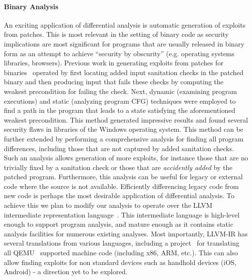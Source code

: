 
\paragraph{Binary Analysis}
An exciting application of differential analysis is automatic generation of exploits from patches. This is most relevant in the setting of binary code as security implications are most significant for programs that are usually released in binary form as an attempt to achieve ``security by obscurity'' (e.g. operating systems libraries, browsers). Previous work in generating exploits from patches for binaries~\cite{BrumleyPoosankamSongZheng08} operated by first locating added input sanitation checks in the patched binary and then producing input that fails these checks by computing the weakest precondition for failing the check. Next, dynamic (examining program executions) and static (analyzing program CFG) techniques were employed to find a path in the program that leads to a state satisfying the aforementioned weakest precondition. This method generated impressive results and found several security flaws in libraries of the Windows operating system. This method can be further extended by performing a comprehensive analysis for finding all program differences, including those that are not captured by added sanitation checks. Such an analysis allows generation of more exploits, for instance those that are no trivially fixed by a sanitation check or those that are \emph{accidently added} by the patched program. Furthermore, this analysis can be useful for legacy or external code where the source is not available. Efficiently differencing legacy code from new code is perhaps the most desirable application of differential analysis. To achieve this we plan to modify our analysis to operate over the LLVM intermediate representation language~\cite{LattnerAdve04}. This intermediate language is high-level enough to support program analysis, and mature enough as it contains static analysis facilities for numerous existing analyses. Most importantly, LLVM-IR has several translations from various languages, including a project~\cite{Scheller:2009} for translating all QEMU~\cite{Bellard05} supported machine code (including x86, ARM, etc.). This can also allow finding exploits for non standard devices such as handhold devices (iOS, Android) - a direction yet to be explored.

